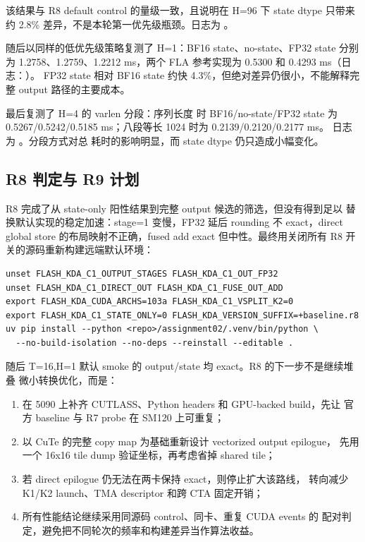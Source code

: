 该结果与 R8 default control 的量级一致，且说明在 H=96 下 state dtype 只带来
约 2.8\% 差异，不是本轮第一优先级瓶颈。日志为
。

随后以同样的低优先级策略复测了 H=1：BF16 state、no-state、FP32 state
分别为 1.2758、1.2759、1.2212 ms，两个 FLA 参考实现为 0.5300 和
0.4293 ms（日志：）。
FP32 state 相对 BF16 state 约快 4.3\%，但绝对差异仍很小，不能解释完整
output 路径的主要成本。

最后复测了 H=4 的 varlen 分段：序列长度
\code{[1300,547,2048,963,271,3063]} 时 BF16/no-state/FP32 state 为
0.5267/0.5242/0.5185 ms；八段等长 1024 时为 0.2139/0.2120/0.2177 ms。
日志为 。分段方式对总
耗时的影响明显，而 state dtype 仍只造成小幅变化。

\subsection{R8 判定与 R9 计划}

R8 完成了从 state-only 阳性结果到完整 output 候选的筛选，但没有得到足以
替换默认实现的稳定加速：stage=1 变慢，FP32 延后 rounding 不 exact，direct
global store 的布局映射不正确，fused add exact 但中性。最终用关闭所有 R8
开关的源码重新构建远端默认环境：

\begin{lstlisting}
unset FLASH_KDA_C1_OUTPUT_STAGES FLASH_KDA_C1_OUT_FP32
unset FLASH_KDA_C1_DIRECT_OUT FLASH_KDA_C1_FUSE_OUT_ADD
export FLASH_KDA_CUDA_ARCHS=103a FLASH_KDA_C1_VSPLIT_K2=0
export FLASH_KDA_C1_STATE_ONLY=0 FLASH_KDA_VERSION_SUFFIX=+baseline.r8
uv pip install --python <repo>/assignment02/.venv/bin/python \
  --no-build-isolation --no-deps --reinstall --editable .
\end{lstlisting}

随后 T=16,H=1 默认 smoke 的 output/state 均 exact。R8 的下一步不是继续堆叠
微小转换优化，而是：

\begin{enumerate}
  \item 在 5090 上补齐 CUTLASS、Python headers 和 GPU-backed build，先让
        官方 baseline 与 R7 probe 在 SM120 上可重复；
  \item 以 CuTe 的完整 copy map 为基础重新设计 vectorized output epilogue，
        先用一个 16x16 tile dump 验证坐标，再考虑省掉 shared tile；
  \item 若 direct epilogue 仍无法在两卡保持 exact，则停止扩大该路线，
        转向减少 K1/K2 launch、TMA descriptor 和跨 CTA 固定开销；
  \item 所有性能结论继续采用同源码 control、同卡、重复 CUDA events 的
        配对判定，避免把不同轮次的频率和构建差异当作算法收益。
\end{enumerate}

